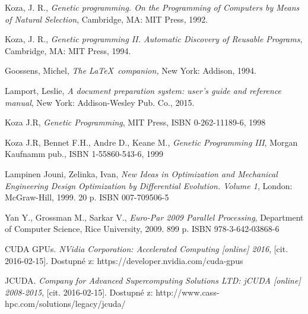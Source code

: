 \documentclass[bc,male,java,dept460]{diploma}		%
\begin{document}
\begin{thebibliography}{99}

 Koza, J. R.,
\textit{Genetic programming. On the Programming of Computers by Means of Natural Selection},
Cambridge, MA: MIT Press, 1992.

 Koza, J. R.,
\textit{Genetic programming II. Automatic Discovery of Reusable Programs},
Cambridge, MA: MIT Press, 1994.

 Goossens, Michel,
\textit{The \LaTeX\ companion,} New York: Addison, 1994.

 Lamport, Leslie,
\textit{A document preparation system: user's guide and reference manual},
New York: Addison-Wesley Pub. Co., 2015.

 Koza J.R, 
\textit{Genetic Programming},
MIT Press, ISBN 0-262-11189-6, 1998

 Koza J.R, Bennet F.H., Andre D., Keane M.,
\textit{Genetic Programming III},
Morgan Kaufnamm pub., ISBN 1-55860-543-6, 1999

 Lampinen Jouni, Zelinka, Ivan,
\textit{New Ideas in Optimization and Mechanical Engineering Design Optimization by Differential Evolution. Volume 1},
London: McGraw-Hill, 1999. 20 p. ISBN 007-709506-5

 Yan Y., Grossman M., Sarkar V.,
\textit{Euro-Par 2009 Parallel Processing},
Department of Computer Science, Rice University, 2009. 899 p. ISBN 978-3-642-03868-6

 CUDA GPUs. 
\textit{NVidia Corporation: Accelerated Computing [online] 2016}, 
[cit. 2016-02-15]. Dostupné z: https://developer.nvidia.com/cuda-gpus

 JCUDA. 
\textit{Company for Advanced Supercomputing Solutions LTD: jCUDA [online] 2008-2015}, 
[cit. 2016-02-15]. Dostupné z: http://www.cass-hpc.com/solutions/legacy/jcuda/

\end{thebibliography}
\end{document}
